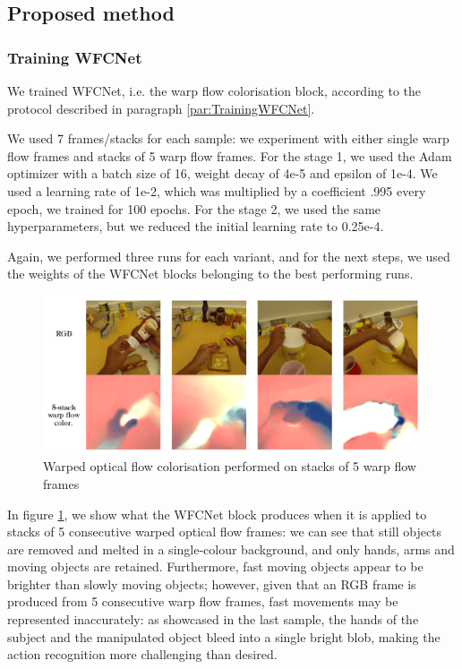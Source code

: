 \documentclass[10pt,twocolumn,letterpaper]{article}
\begin{document}
\subsection{Proposed method}

\subsubsection{Training WFCNet}

We trained WFCNet, i.e. the warp flow colorisation block, according to the protocol described in paragraph \ref{par:TrainingWFCNet}.

We used 7 frames/stacks for each sample: we experiment with either single warp flow frames and stacks of 5 warp flow frames. For the stage 1, we used the Adam optimizer with a batch size of 16, weight decay of 4e-5 and epsilon of 1e-4. We used a learning rate of 1e-2, which was multiplied by a coefficient .995 every epoch, we trained for 100 epochs. For the stage 2, we used the same hyperparameters, but we reduced the initial learning rate to 0.25e-4.

Again, we performed three runs for each variant, and for the next steps, we used the weights of the WFCNet blocks belonging to the best performing runs.

\begin{figure}
	\begin{center}
		\includegraphics[width=\linewidth]{grafici/wfcnet_color_img.pdf}		
	\end{center}
	\caption{Warped optical flow colorisation performed on stacks of 5 warp flow frames}
	\label{fig:wfcnet_color_img}
\end{figure}

In figure \ref{fig:wfcnet_color_img}, we show what the WFCNet block produces when it is applied to stacks of 5 consecutive warped optical flow frames: we can see that still objects are removed and melted in a single-colour background, and only hands, arms and moving objects are retained. Furthermore, fast moving objects appear to be brighter than slowly moving objects; however, given that an RGB frame is produced from 5 consecutive warp flow frames, fast movements may be represented inaccurately: as showcased in the last sample, the hands of the subject and the manipulated object bleed into a single bright blob, making the action recognition more challenging than desired.
\end{document}
